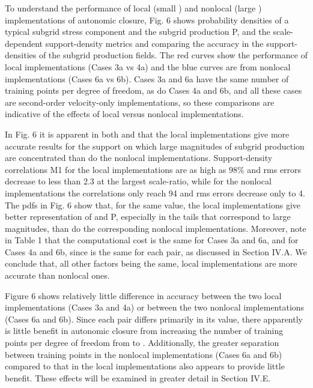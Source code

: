 To understand the performance of local (small  ) and nonlocal (large  ) implementations of autonomic closure, Fig. 6 shows probability densities of a typical subgrid stress component   and the subgrid production P, and the scale-dependent support-density metrics   and   comparing the accuracy in the support-densities of the subgrid production fields. The red curves show the performance of local implementations (Cases 3a vs 4a) and the blue curves are from nonlocal implementations (Cases 6a vs 6b). Cases 3a and 6a have the same number   of training points per degree of freedom, as do Cases 4a and 6b, and all these cases are second-order velocity-only implementations, so these comparisons are indicative of the effects of local versus nonlocal implementations. 

In Fig. 6 it is apparent in both   and   that the local implementations give more accurate results for the support on which large magnitudes of subgrid production are concentrated than do the nonlocal implementations. Support-density correlations M1 for the local implementations are as high as $98\%$ and rms errors   decrease to less than 2.3 at the largest scale-ratio, while for the nonlocal implementations the correlations   only reach 94 and rms errors   decrease only to 4. The pdfs in Fig. 6 show that, for the same   value, the local implementations give better representation of   and P, especially in the tails that correspond to large magnitudes, than do the corresponding nonlocal implementations. Moreover, note in Table 1 that the computational cost is the same for Cases 3a and 6a, and for Cases 4a and 6b, since   is the same for each pair, as discussed in Section IV.A. We conclude that, all other factors being the same, local implementations are more accurate than nonlocal ones. 

Figure 6 shows relatively little difference in accuracy between the two local implementations (Cases 3a and 4a) or between the two nonlocal implementations (Cases 6a and 6b). Since each pair differs primarily in its   value, there apparently is little benefit in autonomic closure from increasing the number of training points per degree of freedom from   to  . Additionally, the greater separation   between training points in the nonlocal implementations (Cases 6a and 6b) compared to that in the local implementations also appears to provide little benefit. These effects will be examined in greater detail in Section IV.E.

